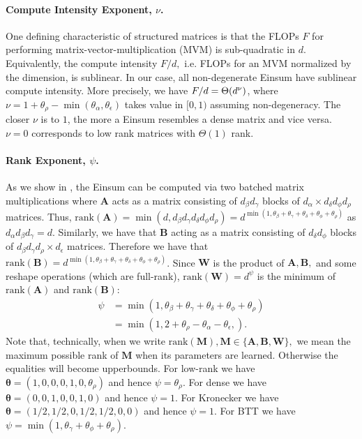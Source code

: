 \documentclass{article}
\newcommand{\mbf}[1]{{\boldsymbol{\mathbf{#1}}}}
\newcommand{\bm}{\mbf}
\renewcommand{\order}[1]{\Theta\qty(#1)}
\begin{document}
\paragraph{Compute Intensity Exponent, $\nu$.}
One defining characteristic of structured matrices is that the FLOPs $F$ for performing matrix-vector-multiplication (MVM) is sub-quadratic in $d.$ Equivalently, the compute intensity $F / d,$ i.e. FLOPs for an MVM normalized by the dimension, is sublinear. In our case, all non-degenerate Einsum have sublinear compute intensity. More precisely, we have $F / d = \order{d^{\nu}}$, where $\nu = 1 + \theta_\rho - \min(\theta_\alpha, \theta_\epsilon)$ takes value in $[0, 1)$ assuming non-degeneracy. The closer $\nu$ is to $1$, the more a Einsum resembles a dense matrix and vice versa. $\nu = 0$ corresponds to low rank matrices with $\Theta(1)$ rank.

\paragraph{Rank Exponent, $\psi$.}
As we show in , the Einsum can be computed via two batched matrix multiplications
where $\bm{A}$ acts as a matrix consisting of $d_{\beta} d_{\gamma}$ blocks of $d_{\alpha} \times d_{\delta} d_{\phi} d_{\rho}$ matrices. Thus, $\text{rank}(\bm{A}) = \min(d, d_{\beta} d_{\gamma} d_{\delta} d_{\phi} d_{\rho}) =
d^{\min(1, \theta_{\beta} + \theta_{\gamma} + \theta_{\delta} + \theta_{\phi} + \theta_{\rho})}$ as $d_{\alpha} d_{\beta} d_{\gamma} = d$.
Similarly, we have that $\bm{B}$ acting as a matrix consisting of $d_{\delta} d_{\phi}$ blocks
of $d_{\beta} d_{\gamma} d_{\rho} \times d_{\epsilon}$ matrices.
Therefore we have that $\text{rank}(\bm{B}) =
d^{\min(1, \theta_{\beta} + \theta_{\gamma} + \theta_{\delta} + \theta_{\phi} + \theta_{\rho})}$.
Since $\bm{W}$ is the product of $\bm{A}, \bm{B},$ and some reshape operations (which are full-rank), $\text{rank}(\bm{W})= d^{\psi}$ is the minimum of $\text{rank}(\bm{A})$ and $\text{rank}(\bm{B}):$
\begin{equation*}
    \begin{split}
      \psi
      &=
      \min(
      1,
      \theta_{\beta} + \theta_{\gamma} + \theta_{\delta} + \theta_{\phi} + \theta_{\rho}
      )
      \\
      &=
      \min(
      1,
      2 + \theta_{\rho} - \theta_{\alpha} - \theta_{\epsilon},
      )
      .
    \end{split}
\end{equation*}
Note that, technically, when we write $\text{rank}(\bm{M}), \bm{M} \in \{\bm{A}, \bm{B}, \bm{W}\},$ we mean the maximum possible rank of $\bm{M}$ when its parameters are learned. Otherwise the equalities will become upperbounds.
For low-rank we have $\bm{\theta}=(1, 0, 0, 0, 1, 0, \theta_{\rho})$ and hence $\psi = \theta_{\rho}$.
For dense we have $\bm{\theta}=(0, 0, 1, 0, 0, 1, 0)$ and hence $\psi= 1$.
For Kronecker we have $\bm{\theta}=(1/2, 1/2, 0, 1/2, 1/2, 0, 0)$ and hence $\psi = 1$.
For BTT we have $\psi = \min(1, \theta_{\gamma} + \theta_{\phi} + \theta_{\rho})$.
\end{document}
